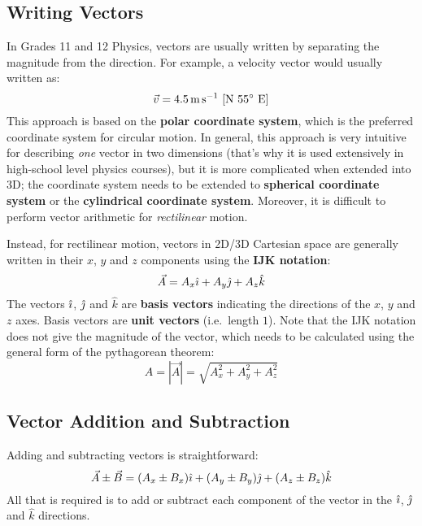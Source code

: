 \documentclass{../../oss-handout}
\newcommand{\iii}{\ensuremath\hat\imath}
\newcommand{\jjj}{\ensuremath\hat\jmath}
\newcommand{\kkk}{\ensuremath{\hat k}}
\begin{document}
\subsection{Writing Vectors}
In Grades 11 and 12 Physics, vectors are usually written by separating the
magnitude from the direction. For example, a velocity vector would usually
written as:
\begin{equation*}
  \vec v=\SI{4.5}{\metre\per\second}\text{ [N \ang{55} E]}
\end{equation*}
This approach is based on the \textbf{polar coordinate system}, which is the
preferred coordinate system for circular motion. In general, this approach is
very intuitive for describing \emph{one} vector in
two dimensions (that's why it is used extensively in high-school level
physics courses), but it is more complicated when extended into 3D; the
coordinate system needs to be extended to \textbf{spherical coordinate system}
or the \textbf{cylindrical coordinate system}. Moreover, it is difficult to
perform vector arithmetic for \emph{rectilinear} motion.

Instead, for rectilinear motion, vectors in 2D/3D Cartesian space are generally
written in their $x$, $y$ and $z$ components using the \textbf{IJK notation}:
\begin{equation*}
  \vec A=A_x\iii + A_y\jjj + A_z\kkk
\end{equation*}
The vectors $\iii$, $\jjj$ and $\kkk$ are
\textbf{basis vectors} indicating the directions of the $x$, $y$ and $z$ axes.
Basis vectors are \textbf{unit vectors} (i.e.\ length $1$). Note that the
IJK notation does not give the magnitude of the vector, which needs to be
calculated using the general form of the pythagorean theorem:
\begin{equation*}
  A=|\vec A|=\sqrt{A_x^2 + A_y^2 + A_z^2}
\end{equation*}


\subsection{Vector Addition and Subtraction}

Adding and subtracting vectors is straightforward:
\begin{equation*}
  \vec A\pm\vec B=
  (A_x\pm B_x)\iii +
  (A_y\pm B_y)\jjj +
  (A_z\pm B_z)\kkk
\end{equation*}
All that is required is to add or subtract each component of the vector in the
$\iii$, $\jjj$ and $\kkk$ directions.
\end{document}
